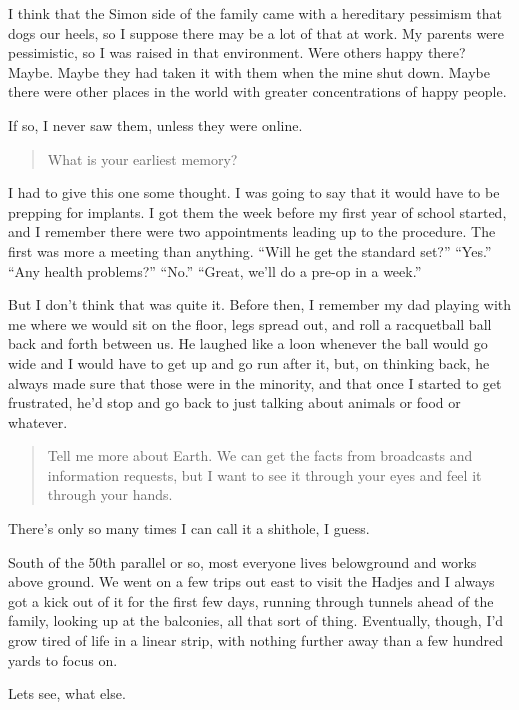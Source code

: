 I think that the Simon side of the family came with a hereditary pessimism that dogs our heels, so I suppose there may be a lot of that at work. My parents were pessimistic, so I was raised in that environment. Were others happy there? Maybe. Maybe they had taken it with them when the mine shut down. Maybe there were other places in the world with greater concentrations of happy people.

If so, I never saw them, unless they were online.

\begin{quote}
What is your earliest memory?
\end{quote}

\noindent I had to give this one some thought. I was going to say that it would have to be prepping for implants. I got them the week before my first year of school started, and I remember there were two appointments leading up to the procedure. The first was more a meeting than anything. ``Will he get the standard set?'' ``Yes.'' ``Any health problems?'' ``No.'' ``Great, we'll do a pre-op in a week.''

But I don't think that was quite it. Before then, I remember my dad playing with me where we would sit on the floor, legs spread out, and roll a racquetball ball back and forth between us. He laughed like a loon whenever the ball would go wide and I would have to get up and go run after it, but, on thinking back, he always made sure that those were in the minority, and that once I started to get frustrated, he'd stop and go back to just talking about animals or food or whatever.

\begin{quote}
Tell me more about Earth. We can get the facts from broadcasts and information requests, but I want to see it through your eyes and feel it through your hands.
\end{quote}

\noindent There's only so many times I can call it a shithole, I guess.

South of the 50th parallel or so, most everyone lives belowground and works above ground. We went on a few trips out east to visit the Hadjes and I always got a kick out of it for the first few days, running through tunnels ahead of the family, looking up at the balconies, all that sort of thing. Eventually, though, I'd grow tired of life in a linear strip, with nothing further away than a few hundred yards to focus on.

Lets see, what else.

